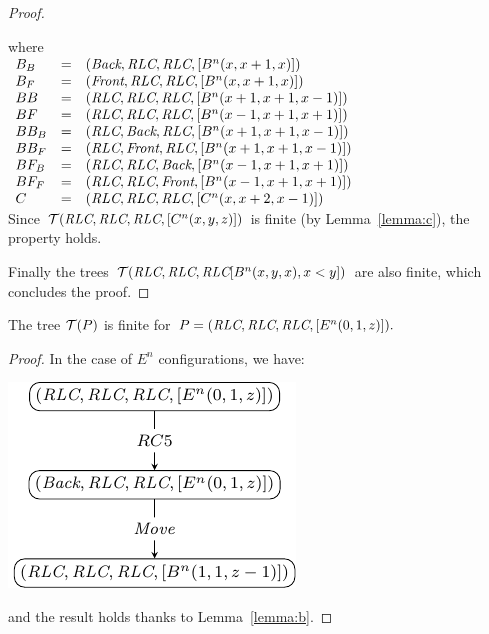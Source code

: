 \begin{proof}
\begin{itemize}[parsep=0cm, itemsep=0cm, topsep=0cm]
		where\\
$\begin{array}{l c l}
B_B & = & (\textit{Back}, \textit{RLC}, \textit{RLC}, [B^n(x, x+1, x)])\\
B_F  & = & (\textit{Front}, \textit{RLC}, \textit{RLC}, [B^n(x, x+1, x)])\\
BB  & = & (\textit{RLC}, \textit{RLC}, \textit{RLC}, [B^n(x+1, x+1, x-1)])\\
BF & = &  (\textit{RLC}, \textit{RLC}, \textit{RLC}, [B^n(x-1, x+1, x+1)])\\
BB_B  & = & (\textit{RLC}, \textit{Back}, \textit{RLC}, [B^n(x+1, x+1, x-1)])\\
BB_F & = & (\textit{RLC}, \textit{Front}, \textit{RLC}, [B^n(x+1, x+1, x-1)])\\
BF_B & = & (\textit{RLC}, \textit{RLC}, \textit{Back}, [B^n(x-1, x+1, x+1)])\\
BF_F  & = & (\textit{RLC}, \textit{RLC}, \textit{Front}, [B^n(x-1, x+1, x+1)])\\
C & = & (\textit{RLC}, \textit{RLC}, \textit{RLC}, [C^n(x, x+2, x-1)])\\
\end{array}$\\

Since $\mathcal{T}(\textit{RLC}, \textit{RLC}, \textit{RLC}, [C^n(x, y, z)])$ is
finite (by Lemma~\ref{lemma:c}), the property holds.
\end{itemize}
Finally the trees
$\mathcal{T}(\textit{RLC}, \textit{RLC}, \textit{RLC}[B^n(x, y, x), x<y])$
are also finite, which concludes the proof.

\end{proof}

\begin{lemma}
\label{lemma:e}
The tree $\mathcal{T}(P)$ is finite for $P=(\textit{RLC}, \textit{RLC}, \textit{RLC}, [E^n(0, 1, z)]).$
\end{lemma}

\begin{proof}
In the case of $E^n$ configurations, we have:
\begin{center}
\includegraphics[scale=1]{figures/figE}
\end{center}
and the result holds thanks to Lemma~\ref{lemma:b}.
\end{proof}


